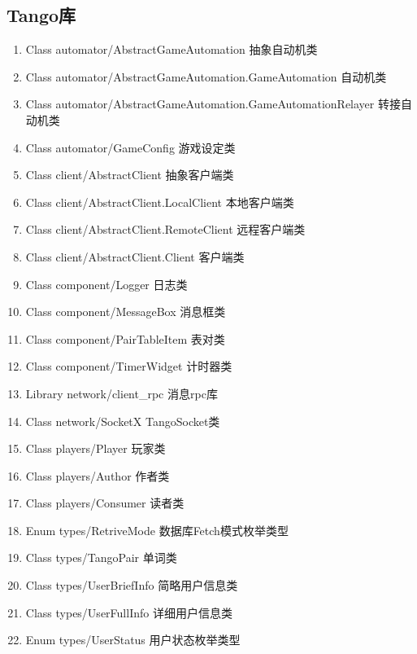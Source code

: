 \documentclass[UTF8]{ctexart}
\begin{document}
\subsection{Tango库}
\begin{enumerate}[1]
    \item \textcolor{cls}{Class} automator/AbstractGameAutomation 抽象自动机类
    \item \textcolor{cls}{Class} automator/AbstractGameAutomation.GameAutomation 自动机类
    \item \textcolor{cls}{Class} automator/AbstractGameAutomation.GameAutomationRelayer 转接自动机类
    \item \textcolor{cls}{Class} automator/GameConfig 游戏设定类
    \item \textcolor{cls}{Class} client/AbstractClient 抽象客户端类
    \item \textcolor{cls}{Class} client/AbstractClient.LocalClient 本地客户端类
    \item \textcolor{cls}{Class} client/AbstractClient.RemoteClient 远程客户端类
    \item \textcolor{cls}{Class} client/AbstractClient.Client 客户端类
    \item \textcolor{cls}{Class} component/Logger 日志类
    \item \textcolor{cls}{Class} component/MessageBox 消息框类
    \item \textcolor{cls}{Class} component/PairTableItem 表对类
    \item \textcolor{cls}{Class} component/TimerWidget 计时器类
    \item \textcolor{func}{Library} network/client\_rpc 消息rpc库
    \item \textcolor{cls}{Class} network/SocketX TangoSocket类
    \item \textcolor{cls}{Class} players/Player 玩家类
    \item \textcolor{cls}{Class} players/Author 作者类
    \item \textcolor{cls}{Class} players/Consumer 读者类
    \item \textcolor{str}{Enum} types/RetriveMode 数据库Fetch模式枚举类型
    \item \textcolor{cls}{Class} types/TangoPair 单词类
    \item \textcolor{cls}{Class} types/UserBriefInfo 简略用户信息类
    \item \textcolor{cls}{Class} types/UserFullInfo 详细用户信息类
    \item \textcolor{str}{Enum} types/UserStatus 用户状态枚举类型
\end{enumerate}
\end{document}
